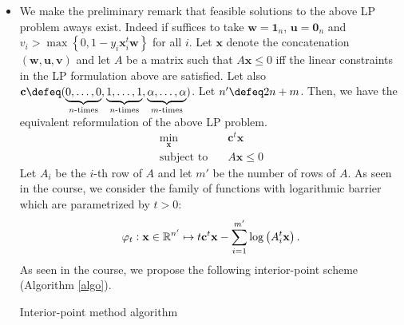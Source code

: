 \documentclass{article}
\begin{document}
\begin{itemize}
       \item We make the preliminary remark that
           feasible solutions to the above LP
           problem aways exist. Indeed
           if suffices to take $\mathbf{w} = \mathbf{1}_{n}$,
           $\mathbf{u} = \mathbf{0}_{n}$ and
           $v_{i} > \max\left\{0, 1 - y_{i}\mathbf{x}_{i}^{t}\mathbf{w}\right\}$ 
           for all $i$.
           Let $\mathbf{x}$ denote the concatenation
           $\left(\mathbf{w}, \mathbf{u}, \mathbf{v}\right)$ and 
           let $A$ be a matrix such that $A\mathbf{x} \leq 0$
           iff the linear constraints in the LP formulation
           above are satisfied. Let also
           $\mathbf{c} \defeq (
           \underbrace{0, \ldots, 0}_{\text{$n$-times}},
           \underbrace{1, \ldots, 1}_{\text{$n$-times}},
           \underbrace{\alpha, \ldots, \alpha}_{\text{$m$-times}})$.
           Let $n' \defeq 2n + m$. Then,
           we have the equivalent reformulation
           of the above LP problem.
           \begin{align*}
               \min_{\mathbf{x}} \quad & \mathbf{c}^{t}\mathbf{x} \\
               \text{subject to} \quad & A \mathbf{x} \leq 0 
           \end{align*}
           Let $A_{i}$ be the $i$-th row of
           $A$ and let $m'$ be the number of
           rows of $A$.
           As seen in the course, we consider
           the family of functions with
           logarithmic barrier which 
           are parametrized by $t > 0$:
           \begin{equation*}
               \varphi_{t} \vcentcolon \mathbf{x} \in \mathbb{R}^{n'}
               \mapsto t \mathbf{c}^{t}\mathbf{x}
               - \sum_{i = 1}^{m'} \log \left(A_{i}^{t}\mathbf{x}\right).
           \end{equation*}
           As seen in the course, we propose
           the following interior-point scheme (Algorithm \ref{algo}).
           \begin{algorithm}
               \label{algo}
               \caption{Interior-point method algorithm}
               

           \end{algorithm}
           

\end{itemize}
\end{document}
